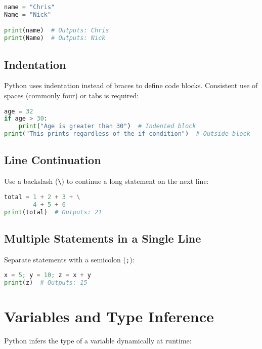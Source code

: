 \begin{lstlisting}[language=Python, caption={Case sensitivity example}]
name = "Chris"
Name = "Nick"

print(name)  # Outputs: Chris
print(Name)  # Outputs: Nick
\end{lstlisting}

\subsection{Indentation}

Python uses indentation instead of braces to define code blocks.  
Consistent use of spaces (commonly four) or tabs is required:

\begin{lstlisting}[language=Python, caption={Indentation example}]
age = 32
if age > 30:
    print("Age is greater than 30")  # Indented block
print("This prints regardless of the if condition")  # Outside block
\end{lstlisting}

\subsection{Line Continuation}

Use a backslash (\texttt{\textbackslash}) to continue a long statement on the next line:

\begin{lstlisting}[language=Python, caption={Line continuation example}]
total = 1 + 2 + 3 + \
        4 + 5 + 6
print(total)  # Outputs: 21
\end{lstlisting}

\subsection{Multiple Statements in a Single Line}

Separate statements with a semicolon (\texttt{;}):

\begin{lstlisting}[language=Python, caption={Multiple statements in one line}]
x = 5; y = 10; z = x + y
print(z)  # Outputs: 15
\end{lstlisting}

\section{Variables and Type Inference}

Python infers the type of a variable dynamically at runtime:

